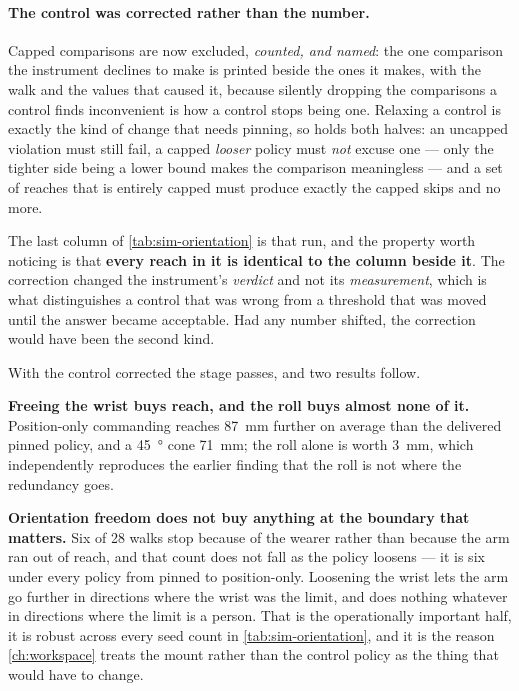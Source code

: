 \paragraph{The control was corrected rather than the number.} Capped
comparisons are now excluded, \emph{counted, and named}: the one comparison
the instrument declines to make is printed beside the ones it makes, with the
walk and the values that caused it, because silently dropping the comparisons
a control finds inconvenient is how a control stops being one. Relaxing a
control is exactly the kind of change that needs pinning, so
 holds
both halves: an uncapped violation must still fail, a capped \emph{looser}
policy must \emph{not} excuse one --- only the tighter side being a lower
bound makes the comparison meaningless --- and a set of reaches that is
entirely capped must produce exactly the capped skips and no more.

The last column of \cref{tab:sim-orientation} is that run, and the property
worth noticing is that \textbf{every reach in it is identical to the column
beside it}. The correction changed the instrument's \emph{verdict} and not
its \emph{measurement}, which is what distinguishes a control that was wrong
from a threshold that was moved until the answer became acceptable. Had any
number shifted, the correction would have been the second kind.

With the control corrected the stage passes, and two results follow.

\textbf{Freeing the wrist buys reach, and the roll buys almost none of it.}
Position-only commanding reaches \SI{87}{\milli\metre} further on average
than the delivered pinned policy, and a \SI{45}{\degree} cone
\SI{71}{\milli\metre}; the roll alone is worth \SI{3}{\milli\metre}, which
independently reproduces the earlier finding that the roll is not where the
redundancy goes.

\textbf{Orientation freedom does not buy anything at the boundary that
matters.} Six of \num{28} walks stop because of the wearer rather than
because the arm ran out of reach, and that count does not fall as the policy
loosens --- it is six under every policy from pinned to position-only.
Loosening the wrist lets the arm go further in directions where the wrist was
the limit, and does nothing whatever in directions where the limit is a
person. That is the operationally important half, it is robust across every
seed count in \cref{tab:sim-orientation}, and it is the reason
\cref{ch:workspace} treats the mount rather than the control policy as the
thing that would have to change.


